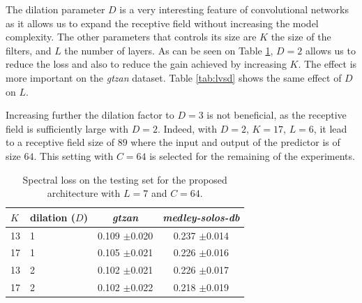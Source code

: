 \documentclass{article}
\newcommand{\fg}[1]{\textcolor{red}{FG : #1}}
\begin{document}
The dilation parameter $D$ is a very interesting feature of convolutional networks as it allows us to expand the receptive field without increasing the model complexity. The other parameters that controls its size are $K$ the size of the filters, and $L$ the number of layers. As can be seen on Table \ref{tab:kvsd}, $D=2$ allows us to reduce the loss and also to reduce the gain achieved by increasing $K$. The effect is more important on the \textit{gtzan} dataset. Table \ref{tab:lvsd} shows the same effect of $D$ on $L$. %

Increasing further the dilation factor to $D=3$ is not beneficial, as the receptive field is sufficiently large with $D=2$. Indeed, with $D=2$, $K=17$, $L=6$, it lead to a receptive field size of $89$ where the input and output of the predictor is of size $64$. This setting with $C=64$ is selected for the remaining of the experiments.

%


\begin{table}[t]
  \caption{Spectral loss on the testing set for the proposed architecture with $L=7$ and $C=64$.}
  \label{tab:kvsd}
  \begin{center}
\begin{tabular}{llcc}
$K$ & dilation ($D$) & \textit{gtzan} & \textit{medley-solos-db} \\
\hline
13 & 1 & 0.109 $\pm$0.020 & 0.237 $\pm$0.014 \\
17 & 1 & 0.105 $\pm$0.021 & 0.226 $\pm$0.016 \\
13 & 2 & 0.102 $\pm$0.021 & 0.226 $\pm$0.017 \\
17 & 2 & 0.102 $\pm$0.022 & 0.218 $\pm$0.019 \\
\end{tabular}
  \end{center}
  \vspace{-4mm}
\end{table}
\end{document}
